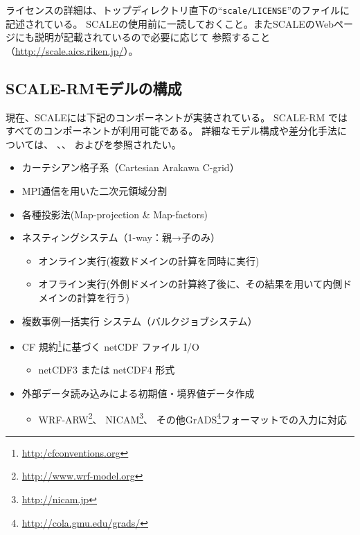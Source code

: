 ライセンスの詳細は、トップディレクトリ直下の``\verb|scale/LICENSE|''のファイルに記述されている。
SCALEの使用前に一読しておくこと。またSCALEのWebページにも説明が記載されているので必要に応じて
参照すること（\url{http://scale.aics.riken.jp/}）。



\subsection{SCALE-RMモデルの構成}  \label{subsec:sturcture_scale_rm}
現在、SCALEには下記のコンポーネントが実装されている。
SCALE-RM ではすべてのコンポーネントが利用可能である。
詳細なモデル構成や差分化手法については、
\citet{scale_2015}、\citet{satoy_2015b}、
および\citet{nishizawa_2015}を参照されたい。\\


\begin{itemize}
 \item カーテシアン格子系（Cartesian Arakawa C-grid）
 \item MPI通信を用いた二次元領域分割
 \item 各種投影法(Map-projection \& Map-factors)
 \item ネスティングシステム（1-way：親→子のみ）
   \begin{itemize}
    \item オンライン実行(複数ドメインの計算を同時に実行)
    \item オフライン実行(外側ドメインの計算終了後に、その結果を用いて内側ドメインの計算を行う)
   \end{itemize}
 \item 複数事例一括実行 システム（バルクジョブシステム）
 \item CF 規約\footnote{\url{http:/cfconventions.org}}に基づく netCDF ファイル I/O
   \begin{itemize}
   \item netCDF3 または netCDF4 形式
   \end{itemize}
 \item 外部データ読み込みによる初期値・境界値データ作成
   \begin{itemize}
    \item WRF-ARW\footnote{\url{http://www.wrf-model.org}}、
NICAM\footnote{\url{http://nicam.jp}}、
その他GrADS\footnote{\url{http://cola.gmu.edu/grads/}}フォーマットでの入力に対応
   \end{itemize}
\end{itemize}

